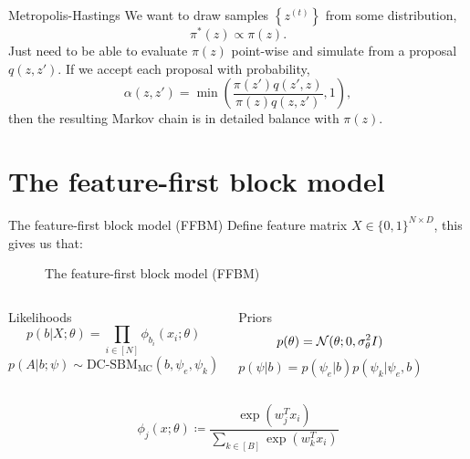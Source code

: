 \documentclass{beamer}
\newcommand{\Gaussian}{\mathcal{N}}
\begin{document}
	\begin{frame}{Metropolis-Hastings \cite{hastings-alg}}
		We want to draw samples $\left\{ z^{(t)} \right\}$ from some distribution,
		$$\pi^*(z) \propto \pi(z).$$
		Just need to be able to evaluate $\pi(z)$ point-wise and simulate from a proposal $q(z, z')$. If we accept each proposal with probability,
		$$\alpha(z, z') = \min \left( \frac{\pi(z') q(z', z)}{\pi(z) q(z, z')} , 1 \right),$$
		then the resulting Markov chain is in detailed balance with $\pi(z)$.
	\end{frame}

\section{The feature-first block model}

	\begin{frame}{The feature-first block model (FFBM)}
		Define feature matrix $X \in \{0, 1\}^{N \times D}$, this gives us that:
		\begin{figure}[!h]
			\centering
			\caption{The feature-first block model (FFBM)}
			\label{fig:ffbm}
		\end{figure}
	
		\begin{columns}
			\begin{block}{Likelihoods}
				$$p(b|X; \theta) = \prod_{i \in [N]} \phi_{b_i} (x_i; \theta)$$
				$$p(A|b; \psi) \sim \textrm{DC-SBM}_{\textrm{MC}} (b, \psi_e, \psi_k)$$
			\end{block}
		
			\begin{block}{Priors}
				$$p(\theta) = \Gaussian(\theta;0, \sigma_\theta^2 I)\vspace{4mm}$$
				$$p(\psi | b) = p(\psi_e | b) p(\psi_k | \psi_e, b)$$
			\end{block}
		\end{columns}
	
		\vspace{5mm}
		$$\phi_{j}(x; \theta) \coloneqq \frac{\exp (w_j^T x_i)}{\sum_{k \in [B]} \exp (w_k^T x_i) }$$
	\end{frame}
\end{document}
